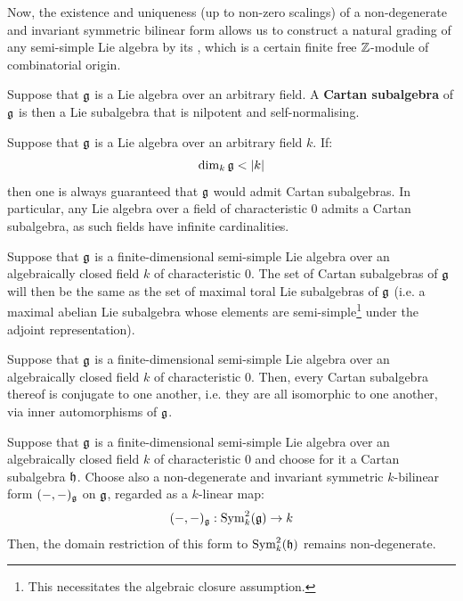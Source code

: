         Now, the existence and uniqueness (up to non-zero scalings) of a non-degenerate and invariant symmetric bilinear form allows us to construct a natural grading of any semi-simple Lie algebra by its , which is a certain finite free $\mathbb{Z}$-module of combinatorial origin. 
        \begin{definition} \label{def: cartan_subalgebras}
            Suppose that $\mathfrak{g}$ is a Lie algebra over an arbitrary field. A \textbf{Cartan subalgebra} of $\mathfrak{g}$ is then a Lie subalgebra that is nilpotent and self-normalising.  
        \end{definition}
        \begin{remark}
            Suppose that $\mathfrak{g}$ is a Lie algebra over an arbitrary field $k$. If:
                $$\dim_k \mathfrak{g} < |k|$$
            then one is always guaranteed that $\mathfrak{g}$ would admit Cartan subalgebras. In particular, any Lie algebra over a field of characteristic $0$ admits a Cartan subalgebra, as such fields have infinite cardinalities. 
        \end{remark}
        \begin{lemma} \label{lemma: cartan_subalgebras_are_maxaimal_toral_subalgebras}
            Suppose that $\mathfrak{g}$ is a finite-dimensional semi-simple Lie algebra over an algebraically closed field $k$ of characteristic $0$. The set of Cartan subalgebras of $\mathfrak{g}$ will then be the same as the set of maximal toral Lie subalgebras of $\mathfrak{g}$ (i.e. a maximal abelian Lie subalgebra whose elements are semi-simple\footnote{This necessitates the algebraic closure assumption.} under the adjoint representation).  
        \end{lemma}
        \begin{lemma}
            Suppose that $\mathfrak{g}$ is a finite-dimensional semi-simple Lie algebra over an algebraically closed field $k$ of characteristic $0$. Then, every Cartan subalgebra thereof is conjugate to one another, i.e. they are all isomorphic to one another, via inner automorphisms of $\mathfrak{g}$. 
        \end{lemma}
        \begin{lemma} \label{lemma: non_degeneracy_of_invariant_bilinear_forms_on_cartan_subalgebras}
            Suppose that $\mathfrak{g}$ is a finite-dimensional semi-simple Lie algebra over an algebraically closed field $k$ of characteristic $0$ and choose for it a Cartan subalgebra $\mathfrak{h}$. Choose also a non-degenerate and invariant symmetric $k$-bilinear form $(-, -)_{\mathfrak{g}}$ on $\mathfrak{g}$, regarded as a $k$-linear map:
                $$(-, -)_{\mathfrak{g}}: \mathrm{Sym}_k^2(\mathfrak{g}) \to k$$
            Then, the domain restriction of this form to $\mathrm{Sym}_k^2(\mathfrak{h})$ remains non-degenerate. 
        \end{lemma}
